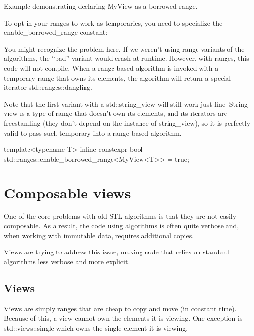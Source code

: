 \begin{box-note}
\footnotesize Example demonstrating declaring MyView as a borrowed range.
\tcblower
{}
\end{box-note}

To opt-in your ranges to work as temporaries, you need to specialize the enable\_borrowed\_range constant:


You might recognize the problem here. If we weren’t using range variants of the algorithms, the “bad” variant would crash at runtime. However, with ranges, this code will not compile. When a range-based algorithm is invoked with a temporary range that owns its elements, the algorithm will return a special iterator std::ranges::dangling.

Note that the first variant with a std::string\_view will still work just fine. String view is a type of range that doesn’t own its elements, and its iterators are freestanding (they don’t depend on the instance of string\_view), so it is perfectly valid to pass such temporary into a range-based algorithm.



\begin{box-note}
\begin{cppcode}
template<typename T>
inline constexpr bool 
    std::ranges::enable_borrowed_range<MyView<T>> = true;
\end{cppcode}
\end{box-note}

\section{Composable views}

One of the core problems with old STL algorithms is that they are not easily composable. As a result, the code using algorithms is often quite verbose and, when working with immutable data, requires additional copies.

Views are trying to address this issue, making code that relies on standard algorithms less verbose and more explicit.

\subsection{Views}

Views are simply ranges that are cheap to copy and move (in constant time). Because of this, a view cannot own the elements it is viewing. One exception is std::views::single which owns the single element it is viewing.

